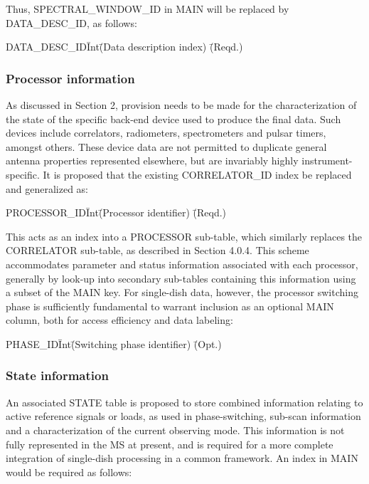 \documentclass{article}
\begin{document}
Thus, SPECTRAL\_WINDOW\_ID in MAIN will be replaced by DATA\_DESC\_ID,
as follows:

\begin{tabbing}
DATA\_DESC\_ID\quad\quad \= Int\quad\quad \= (Data description index)
 \quad\quad \= (Reqd.) \\
\end{tabbing}

\subsubsection{Processor information}

As discussed in Section 2, provision needs to be made for the
characterization of the state of the specific back-end device used to
produce the final data. Such devices include correlators, radiometers,
spectrometers and pulsar timers, amongst others. These device data are not
permitted to duplicate general antenna properties represented
elsewhere, but are invariably highly instrument-specific. It is
proposed that the existing CORRELATOR\_ID index be replaced and
generalized as:

\begin{tabbing}
PROCESSOR\_ID\quad\quad \= Int\quad\quad \= (Processor identifier)
 \quad\quad \= (Reqd.) \\
\end{tabbing} 

This acts as an index into a PROCESSOR sub-table, which similarly
replaces the CORRELATOR sub-table, as described in Section 4.0.4.
This scheme accommodates parameter and status information associated
with each processor, generally by look-up into secondary sub-tables
containing this information using a subset of the MAIN key. For
single-dish data, however, the processor switching phase is
sufficiently fundamental to warrant inclusion as an optional MAIN
column, both for access efficiency and data labeling:

\begin{tabbing}
PHASE\_ID\quad\quad \= Int\quad\quad \= (Switching phase identifier)
 \quad\quad \= (Opt.) \\
\end{tabbing} 

\subsubsection{State information}

An associated STATE table is proposed to store combined information
relating to active reference signals or loads, as used in phase-switching, sub-scan information and a characterization of the current observing mode. This information is not fully represented in the MS at present, and is required for a more complete integration of single-dish processing in a common framework. An index in MAIN would be required as follows:
\end{document}
